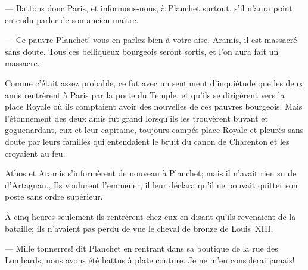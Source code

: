 — Battons donc Paris, et informons-nous, à Planchet surtout, s'il n'aura point entendu parler de son ancien maître.

— Ce pauvre Planchet! vous en parlez bien à votre aise, Aramis, il est massacré sans doute. Tous ces belliqueux bourgeois seront sortis, et l'on aura fait un massacre.

Comme c'était assez probable, ce fut avec un sentiment d'inquiétude que les deux amis rentrèrent à Paris par la porte du Temple, et qu'ils se dirigèrent vers la place Royale où ils comptaient avoir des nouvelles de ces pauvres bourgeois. Mais l'étonnement des deux amis fut grand lorsqu'ils les trouvèrent buvant et goguenardant, eux et leur capitaine, toujours campés place Royale et pleurés sans doute par leurs familles qui entendaient le bruit du canon de Charenton et les croyaient au feu.

Athos et Aramis s'informèrent de nouveau à Planchet; mais il n'avait rien su de d'Artagnan., Ils voulurent l'emmener, il leur déclara qu'il ne pouvait quitter son poste sans ordre supérieur.

À cinq heures seulement ils rentrèrent chez eux en disant qu'ils revenaient de la bataille; ils n'avaient pas perdu de vue le cheval de bronze de Louis~XIII.

— Mille tonnerres! dit Planchet en rentrant dans sa boutique de la rue des Lombards, nous avons été battus à plate couture. Je ne m'en consolerai jamais!